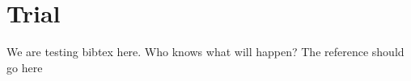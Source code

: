\documentclass[a4paper,12pt, onecolumn]{article}
\begin{document}
\section{Trial}

We are testing bibtex here. Who knows what will happen?
The reference should go here \cite{Tseng}



\end{document}
